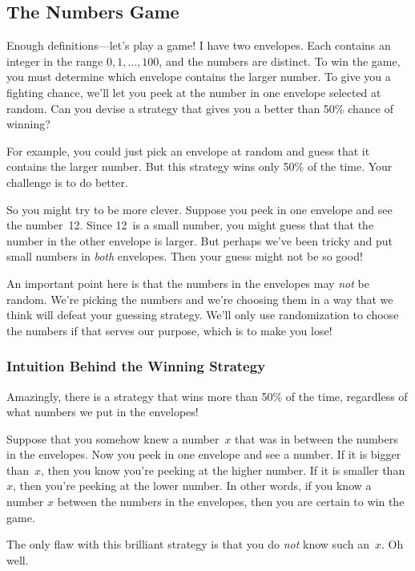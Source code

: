 \subsection{The Numbers Game}\label{bigger_number_subsec}

Enough definitions---let's play a game!  I have two envelopes.  Each
contains an integer in the range $0, 1, \dots, 100$, and the numbers
are distinct.  To win the game, you must determine which envelope
contains the larger number.  To give you a fighting chance, we'll let
you peek at the number in one envelope selected at random.  Can you
devise a strategy that gives you a better than 50\% chance of winning?

For example, you could just pick an envelope at random and guess that
it contains the larger number.  But this strategy wins only 50\% of
the time.  Your challenge is to do better.

So you might try to be more clever.  Suppose you peek in one envelope
and see the number~12.  Since 12~is a small number, you might guess
that that the number in the other envelope is larger.  But perhaps
we've been tricky and put small numbers in \emph{both} envelopes.
Then your guess might not be so good!

An important point here is that the numbers in the envelopes may
\emph{not} be random.  We're picking the numbers and we're choosing
them in a way that we think will defeat your guessing strategy.  We'll
only use randomization to choose the numbers if that serves our
purpose, which is to make you lose!

\subsubsection{Intuition Behind the Winning Strategy}

Amazingly, there is a strategy that wins more than 50\% of the time,
regardless of what numbers we put in the envelopes!

Suppose that you somehow knew a number~$x$ that was in between the
numbers in the envelopes.  Now you peek in one envelope and see a
number.  If it is bigger than~$x$, then you know you're peeking at the
higher number.  If it is smaller than $x$, then you're peeking at the
lower number.  In other words, if you know a number $x$ between the
numbers in the envelopes, then you are certain to win the game.

The only flaw with this brilliant strategy is that you do \emph{not}
know such an~$x$.  Oh well.

